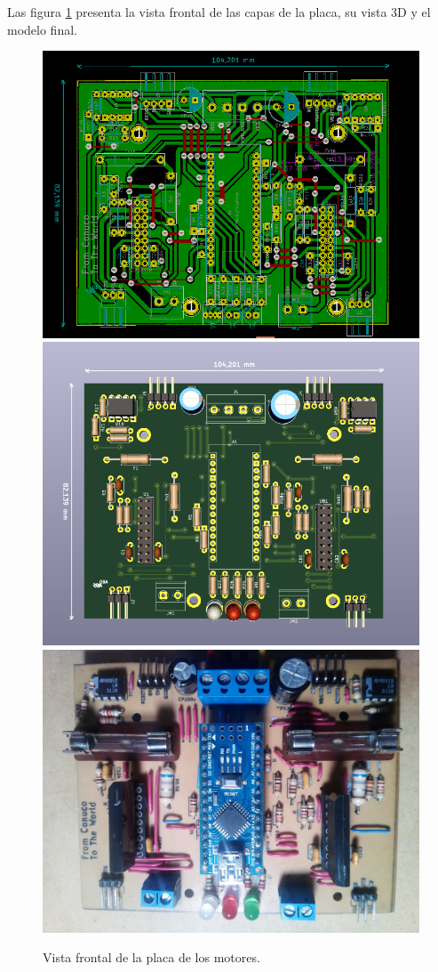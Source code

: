 Las figura \ref{imagen:PlacaMotoresFrontal} presenta la vista frontal de las capas de la placa, su vista 3D y el modelo final.




\begin{figure}[H]
	\centering	
	\includegraphics[width=0.7\linewidth]{imagenes/prototipo/Placa/PCB_FrontAllLayers}	\includegraphics[width=0.7\linewidth]{imagenes/prototipo/Placa/3dViewerFront}
	\includegraphics[width=0.7\linewidth]{imagenes/prototipo/Placa/PCB_FinalFront}
	\caption{Vista frontal de la placa de los motores.}
	\label{imagen:PlacaMotoresFrontal}
\end{figure}

